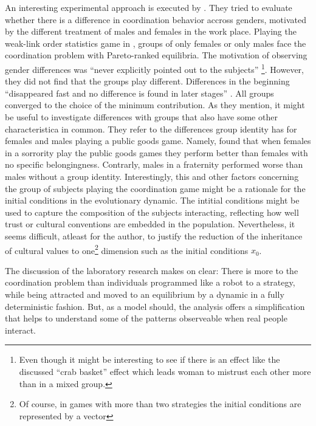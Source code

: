 \documentclass[11pt]{article}
\begin{document}
An interesting experimental approach is executed by 
\textcite{dufwenberg_gender_2005}. They tried to evaluate whether 
there is a difference in coordination behavior accross genders, motivated by 
the different treatment of males and females in the work place. Playing the 
weak-link order statistics game in \cite{van_huyck_tacit_1990}, groups of 
only females or only males face the coordination problem with Pareto-ranked 
equilibria. The motivation of observing gender differences was 
``never explicitly pointed  out to the subjects'' 
\parencite{dufwenberg_gender_2005}\footnote{
Even though it might be interesting to see if there is an effect like 
the discussed ``crab basket'' effect which leads woman to mistrust each other 
more than in a mixed group.}. However, they did not find that the groups play
different. Differences in the beginning ``disappeared fast and no difference
is found in later stages'' \parencite[235]{dufwenberg_gender_2005}. 
All groups converged to the choice of the minimum
contribution. As they mention, it might be useful to investigate differences
with groups that also have some other characteristica in common. They refer
to the differences group identity has for females and males playing a 
public goods game. Namely, \textcite{croson_groups_2008} found that when
females in a sorrority play the public goods games they perform better than 
females with no specific belongingness. Contrarly, males in a fraternity 
performed worse than males without a group identity. 
Interestingly, this and other factors concerning the group of subjects 
playing the coordination game might be a rationale for the initial conditions
in the evolutionary dynamic. The intitial conditions might be used to 
capture the composition of the subjects interacting, reflecting how well
trust or cultural conventions are embedded in the population. 
Nevertheless, it seems difficult, atleast for the author, to justify
the reduction of the inheritance of cultural values to one\footnote{Of course, 
in games with more than two strategies the initial conditions are represented 
by a vector} dimension such as the initial conditions $x_0$.

The discussion of the laboratory research makes on clear: There is more
to the coordination problem than individuals programmed like a robot 
to a strategy, while being attracted and moved to an equilibrium by a dynamic
in a fully deterministic fashion. But, as a model should, the analysis offers 
a simplification that helps to understand some of the patterns observeable 
when real people interact. 
\end{document}
